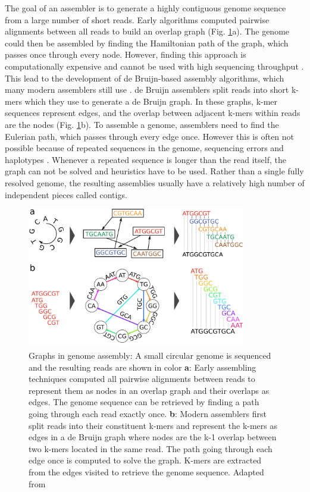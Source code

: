 The goal of an assembler is to generate a highly contiguous genome sequence from a large number of short reads. Early algorithms computed pairwise alignments between all reads to build an overlap graph (Fig. \ref{fig:01-03:debruijn}a). The genome could then be assembled by finding the Hamiltonian path of the graph, which passes once through every node. However, finding this approach is computationally expensive and cannot be used with high sequencing throughput \cite{compeauHowApplyBruijn2011}. This lead to the development of de Bruijn-based assembly algorithms, which many modern assemblers still use \citep{simpsonABySSParallelAssembler2009,zerbinoVelvetAlgorithmsNovo2008}. de Bruijn assemblers split reads into short \Gls{k-mer}s which they use to generate a de Bruijn graph. In these graphs, k-mer sequences represent edges, and the overlap between adjacent k-mers within reads are the nodes (Fig. \ref{fig:01-03:debruijn}b). To assemble a genome, assemblers need to find the Eulerian path, which passes through every edge once. However this is often not possible because of repeated sequences in the genome, sequencing errors and haplotypes \cite{simpsonTheoryPracticeGenome2015}. Whenever a repeated sequence is longer than the read itself, the graph can not be solved and heuristics have to be used. Rather than a single fully resolved genome, the resulting assemblies usually have a relatively high number of independent pieces called \Gls{contig}s.

\begin{figure}
\centering
\includegraphics[width=0.85\textwidth]{Parts/Part01/gfx/debruijn.pdf}
\caption[Graphs in genome assembly.]{Graphs in genome assembly: A small circular genome is sequenced and the resulting reads are shown in color \textbf{a}: Early assembling techniques computed all pairwise alignments between reads to represent them as nodes in an overlap graph and their overlaps as edges. The genome sequence can be retrieved by finding a path going through each read exactly once. \textbf{b}: Modern assemblers first split reads into their constituent k-mers and represent the k-mers as edges in a de Bruijn graph where nodes are the k-1 overlap between two k-mers located in the same read. The path going through each edge once is computed to solve the graph. K-mers are extracted from the edges visited to retrieve the genome sequence. Adapted from \cite{compeauHowApplyBruijn2011}}
\label{fig:01-03:debruijn}
\end{figure}

